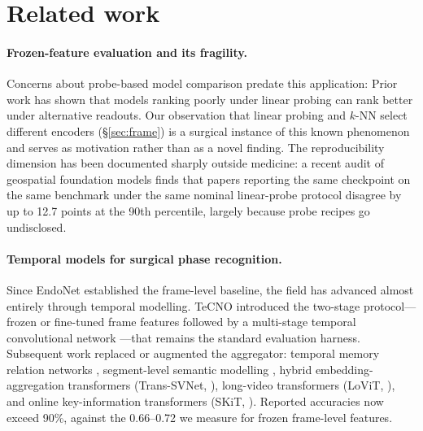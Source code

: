 \documentclass[10pt,twocolumn]{article}
\begin{document}
\section{Related work}

\paragraph{Frozen-feature evaluation and its fragility.}
Concerns about probe-based model comparison predate this application:
Prior work has shown that models ranking poorly under linear
probing can rank better under alternative readouts. Our observation that linear
probing and $k$-NN select different encoders (\S\ref{sec:frame}) is a surgical
instance of this known phenomenon and serves as motivation rather than as a
novel finding. The reproducibility dimension has been documented sharply
outside medicine: a recent audit of geospatial foundation models finds that papers reporting the same checkpoint on the same benchmark under the
same nominal linear-probe protocol disagree by up to 12.7 points at the
90th percentile, largely because probe recipes go undisclosed.

\paragraph{Temporal models for surgical phase recognition.}
Since EndoNet \citep{twinanda2017endonet} established the frame-level baseline,
the field has advanced almost entirely through temporal modelling. TeCNO
\citep{czempiel2020tecno} introduced the two-stage protocol---frozen or
fine-tuned frame features followed by a multi-stage temporal convolutional
network \citep{farha2019mstcn}---that remains the standard evaluation harness.
Subsequent work replaced or augmented the aggregator: temporal memory relation
networks \citep{jin2021tmrnet}, segment-level semantic modelling
\citep{ding2022segment}, hybrid embedding-aggregation transformers
(Trans-SVNet, \citealp{gao2021transsvnet}), long-video transformers (LoViT,
\citealp{liu2025lovit}), and online key-information transformers (SKiT,
\citealp{liu2023skit}). Reported accuracies now exceed 90\%, against the
0.66--0.72 we measure for frozen frame-level features.
\end{document}
